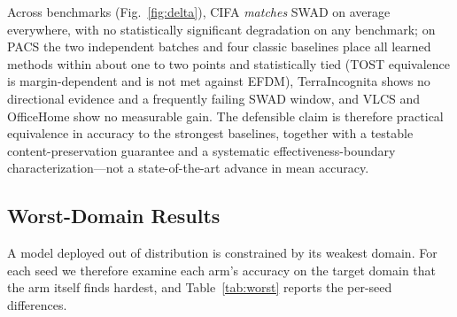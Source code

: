 \documentclass[electronics,article,submit,moreauthors]{Definitions/mdpi}
\newcommand{\add}[1]{\textcolor{addblue}{#1}}
\newcommand{\del}[1]{\textcolor{delred}{\st{#1}}}
\def\add#1{#1}%
\def\del#1{}%
\renewcommand{\add}[1]{#1}
\renewcommand{\del}[1]{}
\begin{document}
Across benchmarks (Fig.~\ref{fig:delta}), CIFA \emph{matches} SWAD on average everywhere, with no statistically significant degradation on any benchmark; on PACS the two independent batches and four classic baselines place all learned methods within about one to two points and statistically tied (TOST equivalence is margin-dependent and is not met against EFDM), \del{TerraIncognita retains a positive but unconfirmed worst-domain direction,}\add{TerraIncognita shows no directional evidence and a frequently failing SWAD window,} and VLCS and OfficeHome show no measurable gain. The defensible claim is therefore practical equivalence in accuracy to the strongest baselines, together with a testable content-preservation guarantee and a systematic effectiveness-boundary characterization---not a state-of-the-art advance in mean accuracy.

\subsection{Worst-Domain Results}

A model deployed out of distribution is constrained by its weakest domain. For each seed we therefore examine each arm's accuracy on the target domain that the arm itself finds hardest, and Table~\ref{tab:worst} reports the per-seed differences.
\end{document}
